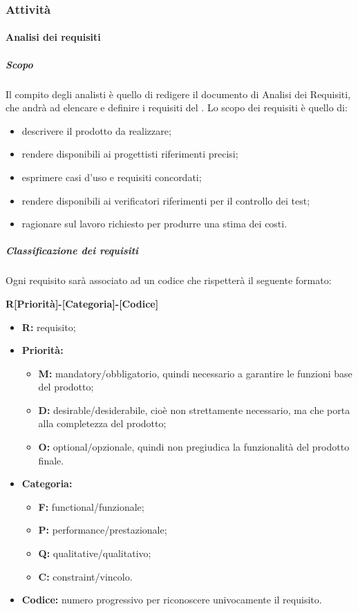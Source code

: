 \documentclass[]{article}
\begin{document}
				\subsubsection{Attività}
				
					\paragraph{Analisi dei requisiti} %
						\subparagraph{Scopo} %
						Il compito degli analisti è quello di redigere il documento di Analisi dei Requisiti, che andrà ad elencare e definire i requisiti del . Lo scopo dei requisiti è quello di:
						\begin{itemize}
							\item descrivere il prodotto da realizzare;
							\item rendere disponibili ai progettisti riferimenti precisi;
							\item esprimere casi d'uso e requisiti concordati;
							\item rendere disponibili ai verificatori riferimenti per il controllo dei test;
							\item ragionare sul lavoro richiesto per produrre una stima dei costi.
						\end{itemize}
						\subparagraph{Classificazione dei requisiti} %
						Ogni requisito sarà associato ad un codice che rispetterà il seguente formato:
						\begin{center}
							\textbf{R[Priorità]-[Categoria]-[Codice]}
						\end{center}
						\begin{itemize}
							\item \textbf{R:} requisito;
							\item \textbf{Priorità:}
								\begin{itemize}
									\item \textbf{M:} mandatory/obbligatorio, quindi necessario a garantire le funzioni base del prodotto;
									\item \textbf{D:} desirable/desiderabile, cioè non strettamente necessario, ma che porta alla completezza del prodotto;
									\item \textbf{O:} optional/opzionale, quindi non pregiudica la funzionalità del prodotto finale.
								\end{itemize}
							\item \textbf{Categoria:}
								\begin{itemize}
									\item \textbf{F:} functional/funzionale;
									\item \textbf{P:} performance/prestazionale;
									\item \textbf{Q:} qualitative/qualitativo;
									\item \textbf{C:} constraint/vincolo.
								\end{itemize}
							\item \textbf{Codice:} numero progressivo per riconoscere univocamente il requisito.
						\end{itemize}
\end{document}
